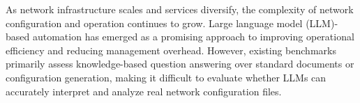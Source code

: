 




As network infrastructure scales and services diversify, the complexity of network configuration and operation continues to grow.
Large language model (LLM)-based automation has emerged as a promising approach to improving operational efficiency and reducing management overhead.
However, existing benchmarks primarily assess knowledge-based question answering over standard documents or configuration generation, making it difficult to evaluate whether LLMs can accurately interpret and analyze real network configuration files.

